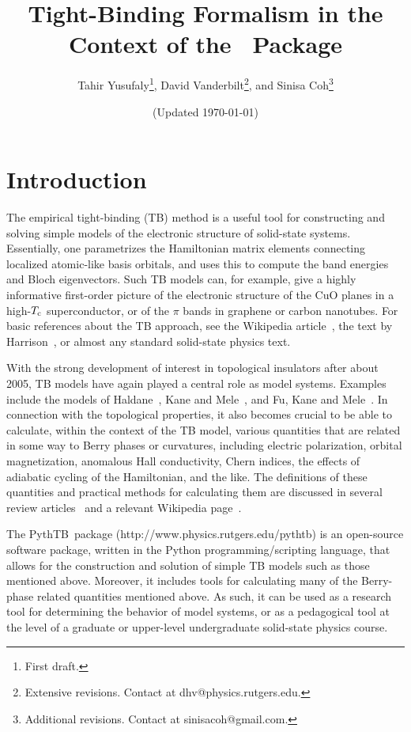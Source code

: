 \documentclass[11pt]{article}
\title{\Large Tight-Binding Formalism in the Context of the \PythTB\ Package}
\author{Tahir Yusufaly\footnote{First draft.},
David Vanderbilt\footnote{Extensive revisions.  Contact at
dhv@physics.rutgers.edu.}, and
Sinisa Coh\footnote{Additional revisions.  Contact at
sinisacoh@gmail.com.}
}
\date{(Updated \today)}
\numberwithin{equation}{section} %
\def\PythTB{{\sc PythTB}}
\begin{document}
\maketitle

\section{Introduction}

The empirical tight-binding (TB) method is a useful tool for
constructing and solving simple models of the electronic structure
of solid-state systems.  Essentially, one parametrizes the
Hamiltonian matrix elements connecting localized atomic-like basis orbitals,
and uses this to compute the band energies and Bloch eigenvectors.
Such TB models can, for example, give a highly informative first-order
picture of the electronic structure of the CuO planes in a
high-$T_{\rm c}$ superconductor, or of the $\pi$ bands in
graphene or carbon nanotubes.  For basic references about the
TB approach, see the Wikipedia article~\cite{wiki-tb},
the text by Harrison~\cite{harrison-book},
or almost any standard solid-state physics text.

With the strong development of interest in topological insulators
after about 2005, TB models have again played a central role as
model systems.  Examples include the models of Haldane~\cite{haldane},
Kane and Mele~\cite{km}, and Fu, Kane and Mele~\cite{fkm}.
In connection with the topological properties, it also becomes
crucial to be able to calculate, within the context of the
TB model, various quantities that are related in some way to
Berry phases or curvatures, including electric polarization,
orbital magnetization, anomalous Hall conductivity, Chern
indices, the effects of adiabatic cycling of the Hamiltonian,
and the like.  The definitions of these quantities and practical
methods for calculating them are discussed in several review
articles~\cite{resta-rmp,vand-resta,xcn,resta-jpcm} and
a relevant Wikipedia page~\cite{wiki-berry}.

The \PythTB\ package (http://www.physics.rutgers.edu/pythtb)
is an open-source software package, written in
the Python programming/scripting language, that
allows for the construction and solution of simple TB models
such as those mentioned above.  Moreover, it includes tools
for calculating many of the Berry-phase related quantities mentioned
above.  As such, it can be used as a research tool for determining
the behavior of model systems, or as a pedagogical tool at the
level of a graduate or upper-level undergraduate solid-state
physics course.
\end{document}
